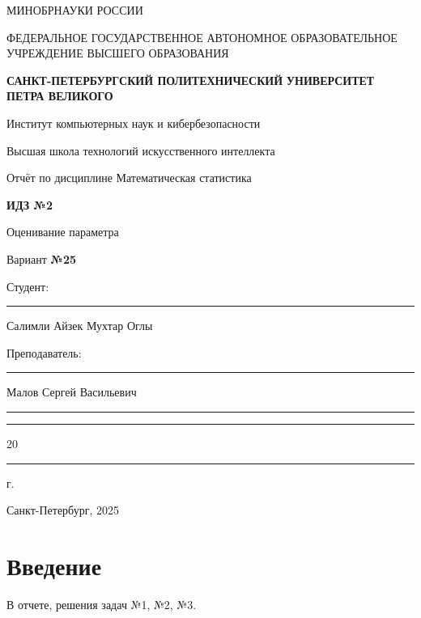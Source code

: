 \documentclass[areasetadvanced]{scrartcl}
\begin{document}
	\thispagestyle{empty}
	\begin{center}
		\large{МИНОБРНАУКИ РОССИИ} \par
		\vspace{0.3cm}
		\normalsize
		{ФЕДЕРАЛЬНОЕ ГОСУДАРСТВЕННОЕ АВТОНОМНОЕ ОБРАЗОВАТЕЛЬНОЕ УЧРЕЖДЕНИЕ ВЫСШЕГО ОБРАЗОВАНИЯ} \par
		\vspace{0.3cm}
		\textbf{\guillemotleft САНКТ-ПЕТЕРБУРГСКИЙ ПОЛИТЕХНИЧЕСКИЙ}
		\textbf{УНИВЕРСИТЕТ ПЕТРА ВЕЛИКОГО\guillemotright} \par
		\vspace{0.3cm}
		{Институт компьютерных наук и кибербезопасности}\par
		{Высшая школа технологий искусственного интеллекта}\par
	\end{center}
	\vfill
	\begin{center}
		{\large Отчёт по дисциплине \guillemotleft Математическая статистика\guillemotright}\par
		{\huge   \textbf{ИДЗ №2}
		
		\guillemotleft Оценивание параметра\guillemotright}\par
            {\huge Вариант \textbf{№25}}
         
	\end{center}
	\vfill
	\begin{flushleft}
		Студент: \hspace{1.8cm} \rule[0pt]{2.5cm}{0.5pt}\hfill Салимли Айзек Мухтар Оглы\par
		\vspace{1.5cm}
		Преподаватель: \hspace{0.55cm} \rule[0pt]{2.5cm}{0.5pt}\hfill Малов Сергей Васильевич
	\end{flushleft}
	\vspace{0.5cm}
	\begin{flushright}
		\guillemotleft \rule[0pt]{0.8cm}{0.5pt}\guillemotright \rule[0pt]{2cm}{0.5pt} 20\rule[0pt]{0.5cm}{0.5pt} г.
	\end{flushright}
	\vfill
	\begin{center}
		Санкт-Петербург, 2025
	\end{center}
	\newpage
	\tableofcontents
	\newpage
\section*{Введение}
В отчете, решения задач №1, №2, №3.
\end{document}
